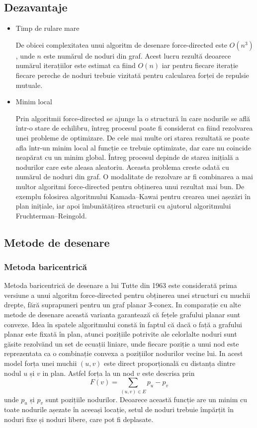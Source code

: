 \subsection{Dezavantaje}

\begin{itemize}
\item Timp de rulare mare

De obicei complexitatea unui algoritm de desenare force-directed este \(O(n^3)\), unde \(n\) este numărul de noduri din graf. 
Acest lucru rezultă deoarece numărul iterațiilor este estimat ca fiind \(O(n)\) iar pentru fiecare iterație fiecare 
pereche de noduri trebuie vizitată pentru calcularea forței de repulsie mutuale.

\item Minim local

Prin algoritmii force-directed se ajunge la o structură în care nodurile se află într-o stare de echilibru, întreg procesul poate 
fi considerat ca fiind rezolvarea unei probleme de optimizare.
De cele mai multe ori starea rezultată se poate afla într-un minim local al funcție ce trebuie optimizate, dar care nu 
coincide neapărat cu un minim global. Întreg procesul depinde de starea inițială a nodurilor care este aleasa aleatoriu. 
Aceasta problema creste odată cu numărul de noduri din graf. O modalitate de rezolvare ar fi combinarea a mai multor 
algoritmi force-directed pentru obținerea unui rezultat mai bun. De exemplu folosirea algoritmului Kamada–Kawai pentru 
crearea unei așezări în plan inițiale, iar apoi îmbunătățirea structurii cu ajutorul algoritmului Fruchterman–Reingold.

\end{itemize}

\subsection{Metode de desenare}
\subsubsection{Metoda baricentrică}
Metoda baricentrică de desenare a lui Tutte din 1963 este considerată prima versiune a unui algoritm force-directed 
pentru obținerea unei structuri cu muchii drepte, fără suprapuneri pentru un graf planar 3-conex. In comparație cu alte 
metode de desenare această varianta garantează că fețele grafului planar sunt convexe. Idea în spatele algoritmului 
constă în faptul că dacă o față a grafului planar este fixată în plan, atunci pozițiile potrivite ale celorlalte noduri sunt 
găsite rezolvănd un set de ecuații liniare, unde fiecare poziție a unui nod este reprezentata ca o combinație convexa a 
pozițiilor nodurilor vecine lui. In acest model forța unei muchii \((u,v)\) este direct proporțională cu distanța dintre 
nodul \(u\) și \(v\) in plan. Astfel forța la un nod \(v\) este descrisa prin 
\[F(v)=\sum_{(u,v) \in E} p_u-p_v\] 
unde \(p_u\) și \(p_v\) sunt pozițiile nodurilor. Deoarece această funcție are un minim cu toate nodurile așezate în aceeași locație, setul 
de noduri trebuie împărțit în noduri fixe și noduri libere, care pot fi deplasate.

